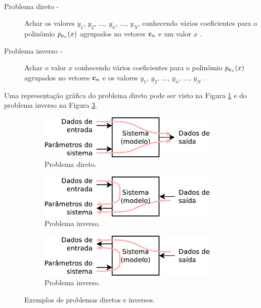 \begin{example}~
\begin{description}
\item[Problema direto -] Achar os valores $y_1$, $y_2$, ..., $y_n$, ..., $y_N$, 
conhecendo vários coeficientes para o polinômio $p_{\VECTOR{c}_n}(x)$ agrupados no vetores $\VECTOR{c}_n$ e
um valor $x$ \cite{Keller76}.
\item[Problema inverso -] Achar o valor $x$
conhecendo vários coeficientes para o polinômio $p_{\VECTOR{c}_n}(x)$ agrupados no vetores $\VECTOR{c}_n$ e
os valores $y_1$, $y_2$, ..., $y_n$, ..., $y_N$  \cite{Keller76}.
\end{description}
Uma representação gráfica do problema direto pode ser visto na Figura \ref{fig:inverso-diretos:direto1}
e do problema inverso na Figura \ref{fig:inverso-diretos:inverso2}.
\end{example}

\begin{figure}[!h]
     \centering
     \begin{subfigure}[b]{0.49\textwidth}
         \centering
         \includegraphics[width=0.95\textwidth]{chapters/notacao/direto1.eps}
         \caption{Problema direto.}
         \label{fig:inverso-diretos:direto1}
     \end{subfigure}
     \hfill
     \begin{subfigure}[b]{0.49\textwidth}
         \centering
         \includegraphics[width=0.95\textwidth]{chapters/notacao/inverso1.eps}
         \caption{Problema inverso.}
         \label{fig:inverso-diretos:inverso1}
     \end{subfigure}
     \hfill
     \begin{subfigure}[b]{0.49\textwidth}
         \centering
         \includegraphics[width=0.95\textwidth]{chapters/notacao/inverso2.eps}
         \caption{Problema inverso.}
         \label{fig:inverso-diretos:inverso2}
     \end{subfigure}
        \caption{Exemplos de problemas diretos e inversos.}
        \label{fig:inverso-diretos}
\end{figure}

